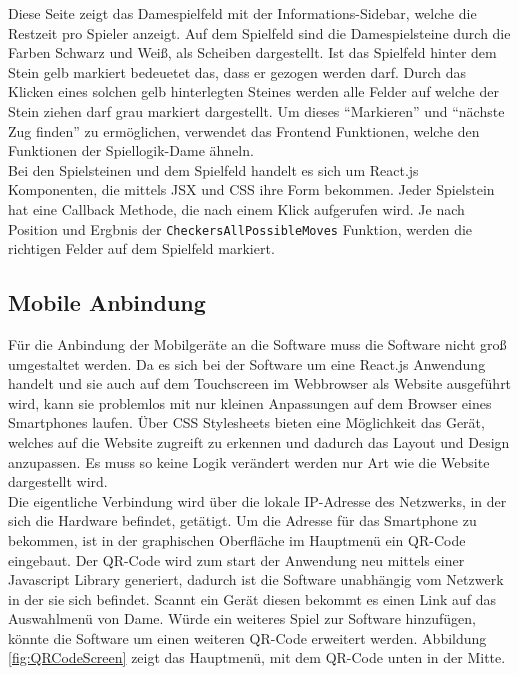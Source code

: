\documentclass[12pt,a4paper,bibliography=totocnumbered,listof=totocnumbered]{article}
\begin{document}
Diese Seite zeigt das Damespielfeld mit der Informations-Sidebar, welche die Restzeit pro Spieler anzeigt.
Auf dem Spielfeld sind die Damespielsteine durch die Farben Schwarz und Weiß, als Scheiben dargestellt. 
Ist das Spielfeld hinter dem Stein gelb markiert bedeuetet das, dass er gezogen werden darf. 
Durch das Klicken eines solchen gelb hinterlegten Steines werden alle Felder auf welche der Stein ziehen darf 
grau markiert dargestellt. Um dieses ``Markieren'' und ``nächste Zug finden'' zu ermöglichen, verwendet das Frontend Funktionen,
welche den Funktionen der Spiellogik-Dame ähneln.
\\
Bei den Spielsteinen und dem Spielfeld handelt es sich um React.js Komponenten, die mittels JSX und CSS ihre Form bekommen.
Jeder Spielstein hat eine Callback Methode, die nach einem Klick aufgerufen wird. Je nach Position und 
Ergbnis der \texttt{CheckersAllPossibleMoves} Funktion, werden die richtigen Felder auf dem Spielfeld markiert.

\subsection{Mobile Anbindung}
Für die Anbindung der Mobilgeräte an die Software muss die Software nicht groß umgestaltet werden. 
Da es sich bei der Software um eine React.js Anwendung handelt und sie auch auf dem Touchscreen im Webbrowser als Website 
ausgeführt wird, kann sie problemlos mit nur kleinen Anpassungen auf dem Browser eines Smartphones laufen.
Über CSS Stylesheets bieten eine Möglichkeit das Gerät, welches auf die Website zugreift zu erkennen und 
dadurch das Layout und Design anzupassen. Es muss so keine Logik verändert werden nur Art wie die Website dargestellt wird.
\\
Die eigentliche Verbindung wird über die lokale IP-Adresse des Netzwerks, in der sich 
die Hardware befindet, getätigt. Um die Adresse für das Smartphone zu bekommen, ist in der graphischen Oberfläche im 
Hauptmenü ein QR-Code eingebaut. Der QR-Code wird zum start der Anwendung neu mittels einer Javascript Library generiert,
dadurch ist die Software unabhängig vom Netzwerk in der sie sich befindet. Scannt ein Gerät diesen bekommt es einen Link auf das Auswahlmenü von Dame. Würde ein weiteres
Spiel zur Software hinzufügen, könnte die Software um einen weiteren QR-Code erweitert werden. 
Abbildung \ref{fig:QRCodeScreen} zeigt das Hauptmenü, mit dem QR-Code unten in der Mitte.
\end{document}
